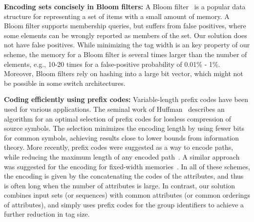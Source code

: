 \textbf{Encoding sets concisely in Bloom filters:} A Bloom filter~\cite{Bloom} is a popular data structure for representing a set of items with a small amount of memory. A Bloom filter supports membership queries, but suffers from false positives, where some elements can be wrongly reported as members of the set. Our solution does not have false positives.  While minimizing the tag width is an key property of our scheme, the memory for a Bloom filter is several times larger than the number of elements, e.g., 10-20 times for a false-positive probability of 0.01\% - 1\%. Moreover, Bloom filters rely on hashing into a large bit vector, which might not be possible in some switch architectures.

\textbf{Coding efficiently using prefix codes:} Variable-length prefix codes have been used for various applications. The seminal work of Huffman~\cite{Huffman} describes an algorithm for an optimal selection of prefix codes for lossless compression of source symbols. The selection minimizes the encoding length by using fewer bits for common symbols, achieving results close to lower bounds from information theory. More recently, prefix codes were suggested as a way to encode paths, while reducing the maximum length of any encoded path~\cite{PathEncoding}. A similar approach was suggested for the encoding for fixed-width memories~\cite{FixedMemories}. In all of these schemes, the encoding is given by the concatenating the codes of the attributes, and thus is often long when the number of attributes is large. In contrast, our solution combines input sets (or sequences) with common attributes (or common orderings of attributes), and simply uses prefix codes for the group identifiers to achieve a further reduction in tag size.

